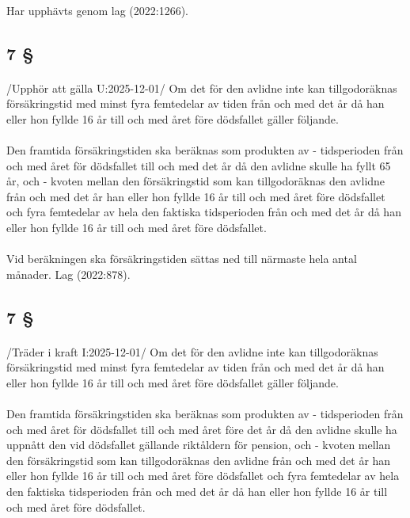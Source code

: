 \documentclass[a4paper,notitlepage,openany,10pt]{book}
\begin{document}
\paragraph*{}
Har upphävts genom
lag (2022:1266).
\subsection*{7 §}
\paragraph*{}
/Upphör att gälla U:2025-12-01/
Om det för den avlidne inte kan tillgodoräknas försäkringstid med minst fyra femtedelar av tiden från och med det år då han eller hon fyllde 16 år till och med året före dödsfallet gäller följande.
\paragraph*{}
Den framtida försäkringstiden ska beräknas som produkten av
\newline - tidsperioden från och med året för dödsfallet till och med det år då den avlidne skulle ha fyllt 65 år, och
\newline - kvoten mellan den försäkringstid som kan tillgodoräknas den avlidne från och med det år han eller hon fyllde 16 år till och med året före dödsfallet och fyra femtedelar av hela den faktiska tidsperioden från och med det år då han eller hon fyllde 16 år till och med året före dödsfallet.
\paragraph*{}
Vid beräkningen ska försäkringstiden sättas ned till närmaste hela antal månader.
Lag (2022:878).
\subsection*{7 §}
\paragraph*{}
/Träder i kraft I:2025-12-01/
Om det för den avlidne inte kan tillgodoräknas försäkringstid med minst fyra femtedelar av tiden från och med det år då han eller hon fyllde 16 år till och med året före dödsfallet gäller följande.
\paragraph*{}
Den framtida försäkringstiden ska beräknas som produkten av
\newline - tidsperioden från och med året för dödsfallet till och med året före det år då den avlidne skulle ha uppnått den vid dödsfallet gällande riktåldern för pension, och
\newline - kvoten mellan den försäkringstid som kan tillgodoräknas den avlidne från och med det år han eller hon fyllde 16 år till och med året före dödsfallet och fyra femtedelar av hela den faktiska tidsperioden från och med det år då han eller hon fyllde 16 år till och med året före dödsfallet.
\end{document}
